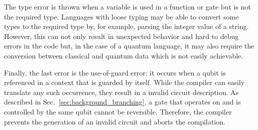 The type error is thrown when a variable is used in a function or gate but is not the required type. Languages with loose typing may be able to convert some types to the required type by, for example, parsing the integer value of a string. However, this can not only result in unexpected behavior and hard to debug errors in the code but, in the case of a quantum language, it may also require the conversion between classical and quantum data which is not easily achievable. 

Finally, the last error is the use-of-guard error; it occurs when a qubit is referenced in a context that is guarded by itself. While the compiler can easily translate any such occurrence, they result in a invalid circuit description. As described in Sec.~\ref{sec:background_branching}, a gate that operates on and is controlled by the same qubit cannot be reversible. Therefore, the compiler prevents the generation of an invalid circuit and aborts the compilation. 